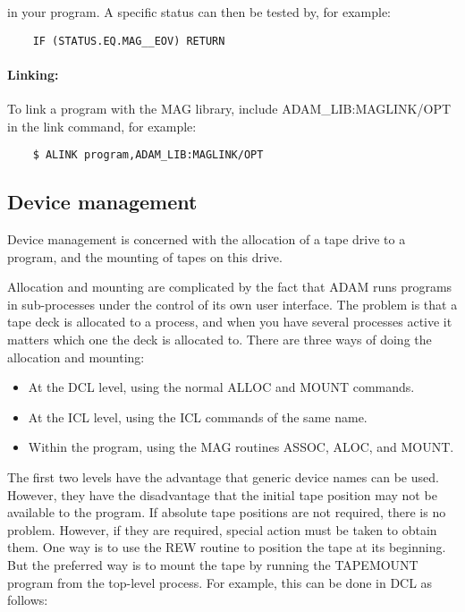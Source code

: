 in your program.
A specific status can then be tested by, for example:

\begin{small}
\begin{verbatim}
    IF (STATUS.EQ.MAG__EOV) RETURN
\end{verbatim}
\end{small}

\paragraph{Linking:}\hfill

To link a program with the MAG library, include ADAM\_LIB:MAGLINK/OPT in the
link command, for example:

\begin{small}
\begin{verbatim}
    $ ALINK program,ADAM_LIB:MAGLINK/OPT
\end{verbatim}
\end{small}

\subsection{Device management}

Device management is concerned with the allocation of a tape drive to a program,
and the mounting of tapes on this drive.

Allocation and mounting are complicated by the fact that ADAM runs programs in
sub-processes under the control of its own user interface.
The problem is that a tape deck is allocated to a process, and when you have
several processes active it matters which one the deck is allocated to.
There are three ways of doing the allocation and mounting:
\begin{itemize}
\item At the DCL level, using the normal ALLOC and MOUNT commands.
\item At the ICL level, using the ICL commands of the same name.
\item Within the program, using the MAG routines ASSOC, ALOC, and MOUNT.
\end{itemize}
The first two levels have the advantage that generic device names can be used.
However, they have the disadvantage that the initial tape position may not
be available to the program.
If absolute tape positions are not required, there is no problem.
However, if they are required, special action must be taken to obtain them.
One way is to use the REW routine to position the tape at its beginning.
But the preferred way is to mount the tape by running the TAPEMOUNT program
from the top-level process.
For example, this can be done in DCL as follows:

